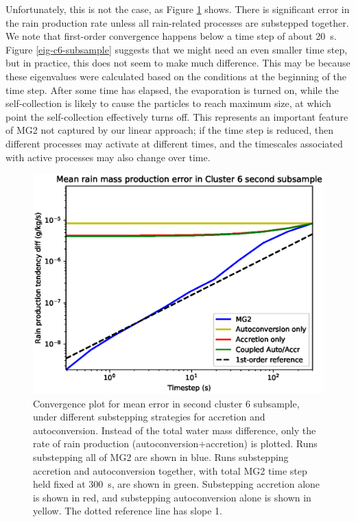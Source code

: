 \documentclass [11pt, proquest] {uwthesis}[2020/02/24]
\begin{document}
Unfortunately, this is not the case, as Figure \ref{convergence-accr-auto2} shows. There is significant error in the rain production rate unless all rain-related processes are substepped together. We note that first-order convergence happens below a time step of about \SI{20}{\second}. Figure \ref{eig-c6-subsample} suggests that we might need an even smaller time step, but in practice, this does not seem to make much difference. This may be because these eigenvalues were calculated based on the conditions at the beginning of the time step. After some time has elapsed, the evaporation is turned on, while the self-collection is likely to cause the particles to reach maximum size, at which point the self-collection effectively turns off. This represents an important feature of MG2 not captured by our linear approach; if the time step is reduced, then different processes may activate at different times, and the timescales associated with active processes may also change over time.

\begin{figure}[ht]
  \includegraphics[width=6.5in]{./substep_convergence_prod_c6_initicefilter.eps}
  \caption{Convergence plot for mean error in second cluster 6 subsample, under different substepping strategies for accretion and autoconversion. Instead of the total water mass difference, only the rate of rain production (autoconversion+accretion) is plotted. Runs substepping all of MG2 are shown in blue. Runs substepping accretion and autoconversion together, with total MG2 time step held fixed at \SI{300}{\second}, are shown in green. Substepping accretion alone is shown in red, and substepping autoconversion alone is shown in yellow. The dotted reference line has slope \num{1}.}
  \label{convergence-accr-auto2}
\end{figure}
\end{document}
